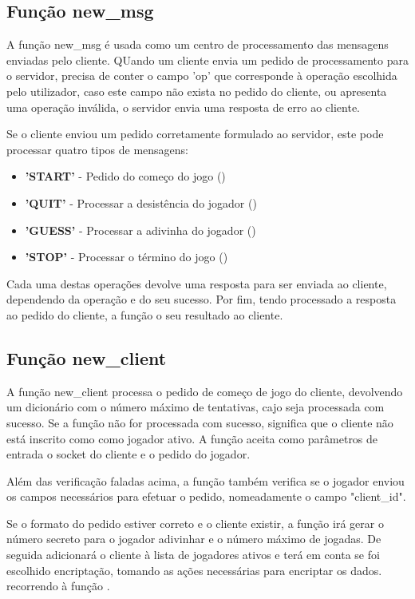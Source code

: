 \documentclass{report}
\begin{document}
\subsection{Função new\_msg}
\label{ssec:func_new_msg}

A função new\_msg é usada como um centro de processamento das mensagens enviadas pelo cliente. QUando um cliente envia um pedido de processamento para o servidor, precisa de conter o campo 'op' que corresponde à operação escolhida pelo utilizador, caso este campo não exista no pedido do cliente, ou apresenta uma operação inválida, o servidor envia uma resposta de erro ao cliente.

Se o cliente enviou um pedido corretamente formulado ao servidor, este pode processar quatro tipos de mensagens:
\begin{itemize}
\item \textbf{'START'} - Pedido do começo do jogo ()
\item \textbf{'QUIT'} - Processar a desistência do jogador ()
\item \textbf{'GUESS'} - Processar a adivinha do jogador ()
\item \textbf{'STOP'} - Processar o término do jogo ()
\end{itemize}
Cada uma destas operações devolve uma resposta para ser enviada ao cliente, dependendo da operação e do seu sucesso. Por fim, tendo processado a resposta ao pedido do cliente, a função o seu resultado ao cliente. 

\subsection{Função new\_client}
\label{ssec:func_new_client}

A função new\_client processa o pedido de começo de jogo do cliente, devolvendo um dicionário com o número máximo de tentativas, cajo seja processada com sucesso. Se a função não for processada com sucesso, significa que o cliente não está inscrito como como jogador ativo. A função aceita como parâmetros de entrada o socket do cliente e o pedido do jogador.

Além das verificação faladas acima, a função também verifica se o jogador enviou os campos necessários para efetuar o pedido, nomeadamente o campo "client\_id".

Se o formato do pedido estiver correto e o cliente existir, a função irá gerar o número secreto para o jogador adivinhar e o número máximo de jogadas. De seguida adicionará o cliente à lista de jogadores ativos e terá em conta se foi escolhido encriptação, tomando as ações necessárias para encriptar os dados. recorrendo à função  .
\end{document}
